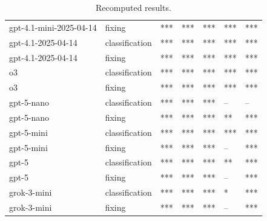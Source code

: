 \begin{table}[!t]
\begin{tabular}{lllllll}
gpt-4.1-mini-2025-04-14 & fixing & *** & *** & *** & *** & *** \\
gpt-4.1-2025-04-14 & classification & *** & *** & *** & *** & *** \\
gpt-4.1-2025-04-14 & fixing & *** & *** & *** & *** & *** \\
o3 & classification & *** & *** & *** & *** & *** \\
o3 & fixing & *** & *** & *** & *** & *** \\
gpt-5-nano & classification & *** & *** & *** & -- & -- \\
gpt-5-nano & fixing & *** & *** & *** & ** & *** \\
gpt-5-mini & classification & *** & *** & *** & *** & *** \\
gpt-5-mini & fixing & *** & *** & *** & -- & *** \\
gpt-5 & classification & *** & *** & *** & ** & *** \\
gpt-5 & fixing & *** & *** & *** & -- & *** \\
grok-3-mini & classification & *** & *** & *** & * & *** \\
grok-3-mini & fixing & *** & *** & *** & -- & *** \\
\bottomrule
\end{tabular}
\caption{Recomputed results.}
\label{tab:p-value_prompting}
\end{table}
